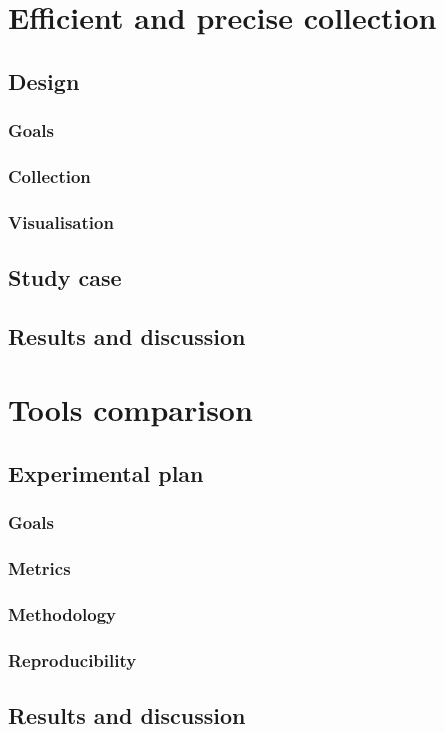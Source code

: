 
\section{Efficient and precise collection}

\subsection{Design}

\subsubsection{Goals}

\subsubsection{Collection}

\subsubsection{Visualisation}

\subsection{Study case}

\subsection{Results and discussion}

\section{Tools comparison}


\subsection{Experimental plan}

\subsubsection{Goals}
\subsubsection{Metrics}
\subsubsection{Methodology}
\subsubsection{Reproducibility}



\subsection{Results and discussion}



